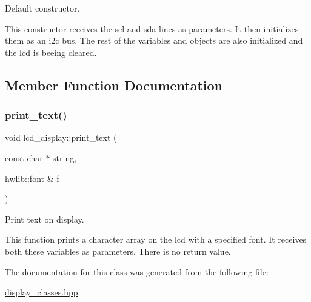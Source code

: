 Default constructor. 

This constructor receives the scl and sda lines as parameters. It then initializes them as an i2c bus. The rest of the variables and objects are also initialized and the lcd is beeing cleared. 

\subsection{Member Function Documentation}
\hypertarget{classlcd__display_a74fc3a72c343a01fdc6169158bb02200}{}\label{classlcd__display_a74fc3a72c343a01fdc6169158bb02200} 
\subsubsection{\texorpdfstring{print\+\_\+text()}{print\_text()}}
{\footnotesize\ttfamily void lcd\+\_\+display\+::print\+\_\+text (\begin{DoxyParamCaption}\item[{const char $\ast$}]{string,  }\item[{hwlib\+::font \&}]{f }\end{DoxyParamCaption})\hspace{0.3cm}{\ttfamily [inline]}}



Print text on display. 

This function prints a character array on the lcd with a specified font. It receives both these variables as parameters. There is no return value. 

The documentation for this class was generated from the following file\+:\begin{DoxyCompactItemize}
\item 
\hyperlink{display__classes_8hpp}{display\+\_\+classes.\+hpp}\end{DoxyCompactItemize}
